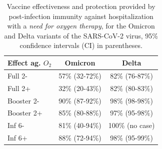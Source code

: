\documentclass[9pt,twocolumn,twoside,lineno]{pnas-new}
\begin{document}
\begin{table}[!ht]
\caption{Vaccine effectiveness and protection provided by post-infection immunity against hospitalization with a {\it need for oxygen therapy}, for the Omicron and Delta variants of the SARS-CoV-2 virus, 95\% confidence intervals (CI) in parentheses.}
\label{tabOalone}
\centering
\begin{tabular}{|l|c|c|}
\hline
\cellcolor{gray!20}Effect ag. $O_2$&\cellcolor{gray!20}Omicron&\cellcolor{gray!20}Delta\\
\hline
Full 2-& 57\% (32-72\%) & 82\% (76-87\%)\\
\cellcolor{gray!10}Full 2+& \cellcolor{gray!10}32\% (20-43\%)&\cellcolor{gray!10}82\% (80-83\%)\\
Booster 2-&90\% (87-92\%)&98\% (98-98\%)\\
\cellcolor{gray!10}Booster 2+&\cellcolor{gray!10}85\% (80-88\%)&\cellcolor{gray!10}97\% (95-98\%)\\
Inf 6-& 81\% (40-94\%)&100\% (no case)\\
\cellcolor{gray!10}Inf 6+&\cellcolor{gray!10}88\% (72-94\%)&\cellcolor{gray!10}98\% (95-99\%)\\
\hline
\end{tabular}
\end{table}

\end{document}
